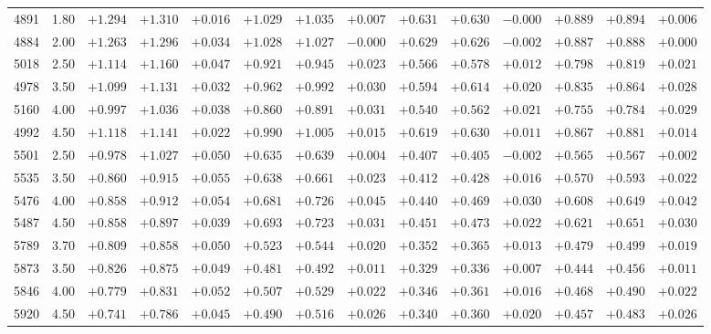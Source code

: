 \documentclass[]{aa}
\begin{document}
\begin{appendix}
\begin{table*}
\begin{center}
\begin{tabular}{llllllllllllll}
4891  &1.80 & $+1.294$ & $+1.310$ & $+0.016$ & $+1.029$ & $+1.035$ & $+0.007$ & $+0.631$ & $+0.630$ & $-0.000$ & $+0.889$ & $+0.894$ & $+0.006$ \\
4884  &2.00 & $+1.263$ & $+1.296$ & $+0.034$ & $+1.028$ & $+1.027$ & $-0.000$ & $+0.629$ & $+0.626$ & $-0.002$ & $+0.887$ & $+0.888$ & $+0.000$ \\
5018  &2.50 & $+1.114$ & $+1.160$ & $+0.047$ & $+0.921$ & $+0.945$ & $+0.023$ & $+0.566$ & $+0.578$ & $+0.012$ & $+0.798$ & $+0.819$ & $+0.021$ \\
4978  &3.50 & $+1.099$ & $+1.131$ & $+0.032$ & $+0.962$ & $+0.992$ & $+0.030$ & $+0.594$ & $+0.614$ & $+0.020$ & $+0.835$ & $+0.864$ & $+0.028$ \\
5160  &4.00 & $+0.997$ & $+1.036$ & $+0.038$ & $+0.860$ & $+0.891$ & $+0.031$ & $+0.540$ & $+0.562$ & $+0.021$ & $+0.755$ & $+0.784$ & $+0.029$ \\
4992  &4.50 & $+1.118$ & $+1.141$ & $+0.022$ & $+0.990$ & $+1.005$ & $+0.015$ & $+0.619$ & $+0.630$ & $+0.011$ & $+0.867$ & $+0.881$ & $+0.014$ \\
5501  &2.50 & $+0.978$ & $+1.027$ & $+0.050$ & $+0.635$ & $+0.639$ & $+0.004$ & $+0.407$ & $+0.405$ & $-0.002$ & $+0.565$ & $+0.567$ & $+0.002$ \\
5535  &3.50 & $+0.860$ & $+0.915$ & $+0.055$ & $+0.638$ & $+0.661$ & $+0.023$ & $+0.412$ & $+0.428$ & $+0.016$ & $+0.570$ & $+0.593$ & $+0.022$ \\
5476  &4.00 & $+0.858$ & $+0.912$ & $+0.054$ & $+0.681$ & $+0.726$ & $+0.045$ & $+0.440$ & $+0.469$ & $+0.030$ & $+0.608$ & $+0.649$ & $+0.042$ \\
5487  &4.50 & $+0.858$ & $+0.897$ & $+0.039$ & $+0.693$ & $+0.723$ & $+0.031$ & $+0.451$ & $+0.473$ & $+0.022$ & $+0.621$ & $+0.651$ & $+0.030$ \\
5789  &3.70 & $+0.809$ & $+0.858$ & $+0.050$ & $+0.523$ & $+0.544$ & $+0.020$ & $+0.352$ & $+0.365$ & $+0.013$ & $+0.479$ & $+0.499$ & $+0.019$ \\
5873  &3.50 & $+0.826$ & $+0.875$ & $+0.049$ & $+0.481$ & $+0.492$ & $+0.011$ & $+0.329$ & $+0.336$ & $+0.007$ & $+0.444$ & $+0.456$ & $+0.011$ \\
5846  &4.00 & $+0.779$ & $+0.831$ & $+0.052$ & $+0.507$ & $+0.529$ & $+0.022$ & $+0.346$ & $+0.361$ & $+0.016$ & $+0.468$ & $+0.490$ & $+0.022$ \\
5920  &4.50 & $+0.741$ & $+0.786$ & $+0.045$ & $+0.490$ & $+0.516$ & $+0.026$ & $+0.340$ & $+0.360$ & $+0.020$ & $+0.457$ & $+0.483$ & $+0.026$ \\

\end{tabular}
\end{center}
\end{table*}
\end{appendix}
\end{document}
